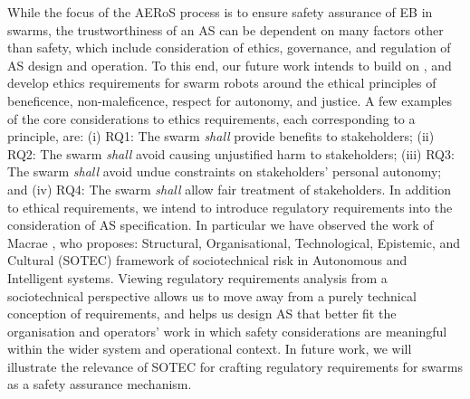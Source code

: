 \documentclass[runningheads]{llncs}
\begin{document}
While the focus of the AERoS process is to ensure safety assurance of EB in swarms, the trustworthiness of an AS can be dependent on many factors other than safety, which include consideration of ethics, governance, and regulation of AS design and operation. 
To this end, our future work intends to build on \cite{Porter2022}, and develop ethics requirements for swarm robots around the ethical principles of beneficence, non-maleficence, respect for autonomy, and justice. A few examples of the core considerations to ethics requirements, each corresponding to a principle, are: (i) RQ1: The swarm \emph{shall} provide benefits to stakeholders; (ii) RQ2: The swarm \emph{shall} avoid causing unjustified harm to stakeholders; (iii) RQ3: The swarm \emph{shall} avoid undue constraints on stakeholders' personal autonomy; and (iv) RQ4: The swarm \emph{shall} allow fair treatment of stakeholders. 
In addition to ethical requirements, we intend to introduce regulatory requirements into the consideration of AS specification. 
In particular we have observed the work of Macrae \cite{macrae2021learning}, who proposes: Structural, Organisational, Technological, Epistemic, and Cultural (SOTEC) framework of sociotechnical risk in Autonomous and Intelligent systems. 
Viewing regulatory requirements analysis from a sociotechnical perspective allows us to move away from a purely technical conception of requirements, and helps us design AS that better fit the organisation and operators’ work in which safety considerations are meaningful within the wider system and operational context. 
In future work, we will illustrate the relevance of SOTEC for crafting regulatory requirements for swarms as a safety assurance mechanism.
%
%
%
\end{document}
